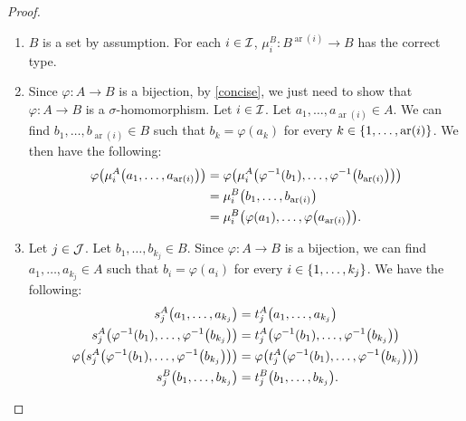 \documentclass[11pt,reqno]{amsart}
\DeclareMathOperator{\ar}{ar}
\renewcommand{\phi}{\varphi}
\begin{document}
\begin{proof}
\begin{enumerate}
\item
$B$ is a set by assumption.
For each $i\in\mathcal{I}$, $\mu_i^B:B^{\ar(i)}\to B$ has the correct type.

\item Since $\phi:A\to B$ is a bijection, by \ref{concise},
we just need to show that $\phi:A\to B$ is a $\sigma$-homomorphism.
Let $i\in\mathcal{I}$.
Let $a_1,\dots,a_{\ar(i)}\in A$.
We can find $b_1,\dots,b_{\ar(i)}\in B$ such that
$b_k=\phi(a_k)$ for every $k\in\set{1,\dots,\ar(i)}$.
We then have the following:
\[\begin{aligned}
\phi\Br{\mu_i^A\Br{a_1,\dots,a_{\ar(i)}}}
&=\phi\Br{\mu_i^A\Br{\phi\inv(b_1),\dots,\phi\inv\Br{b_{\ar(i)}}}}\\
&=\mu_i^B\Br{b_1,\dots,b_{\ar(i)}}\\
&=\mu_i^B\Br{\phi(a_1),\dots,\phi\Br{a_{\ar(i)}}}.\\
\end{aligned}\]

\item Let $j\in\mathcal{J}$.
Let $b_1,\dots,b_{k_j}\in B$.
Since $\phi:A\to B$ is a bijection, we can find $a_1,\dots,a_{k_j}\in A$ such that
$b_i=\phi(a_i)$ for every $i\in\set{1,\dots,k_j}$.
We have the following:
\[\begin{aligned}
s_j^A\Br{a_1,\dots,a_{k_j}}&=t_j^A\Br{a_1,\dots,a_{k_j}}\\
s_j^A\Br{\phi\inv(b_1),\dots,\phi\inv\Br{b_{k_j}}}
&=t_j^A\Br{\phi\inv(b_1),\dots,\phi\inv\Br{b_{k_j}}}\\
\phi\Br{s_j^A\Br{\phi\inv(b_1),\dots,\phi\inv\Br{b_{k_j}}}}
&=\phi\Br{t_j^A\Br{\phi\inv(b_1),\dots,\phi\inv\Br{b_{k_j}}}}\\
s_j^B\Br{b_1,\dots,b_{k_j}}
&=t_j^B\Br{b_1,\dots,b_{k_j}}.\\
\end{aligned}\]
\end{enumerate}
\end{proof}
\end{document}
